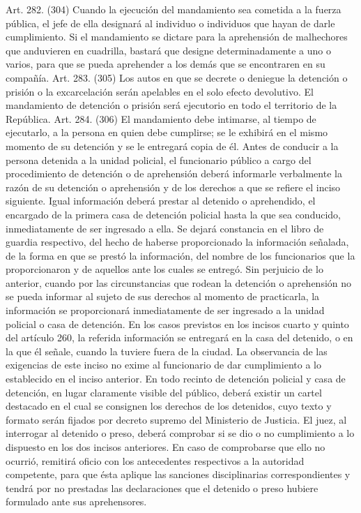     Art. 282. (304) Cuando la ejecución del mandamiento sea cometida a la fuerza pública, el jefe de ella designará al individuo o individuos que hayan de darle cumplimiento.
    Si el mandamiento se dictare para la aprehensión de malhechores que anduvieren en cuadrilla, bastará que designe determinadamente a uno o varios, para que se pueda aprehender a los demás que se encontraren en su compañía.
    Art. 283. (305) Los autos en que se decrete o deniegue la detención o prisión o la excarcelación serán apelables en el solo efecto devolutivo.
    El mandamiento de detención o prisión será ejecutorio en todo el territorio de la República.
    Art. 284. (306) El mandamiento debe intimarse, al tiempo de ejecutarlo, a la persona en quien debe cumplirse; se le exhibirá en el mismo momento de su detención y se le entregará copia de él.
    Antes de conducir a la persona detenida a la unidad policial, el funcionario público a cargo del procedimiento de detención o de aprehensión deberá informarle verbalmente la razón de su detención o aprehensión y de los derechos a que se refiere el inciso siguiente. Igual información deberá prestar al detenido o aprehendido, el encargado de la primera casa de detención policial hasta la que sea conducido, inmediatamente de ser ingresado a ella. Se dejará constancia en el libro de guardia respectivo, del hecho de haberse proporcionado la información señalada, de la forma en que se prestó la información, del nombre de los funcionarios que la proporcionaron y de aquellos ante los cuales se entregó. Sin perjuicio de lo anterior, cuando por las circunstancias que rodean la detención o aprehensión no se pueda informar al sujeto de sus derechos al momento de practicarla, la información se proporcionará inmediatamente de ser ingresado a la unidad policial o casa de detención. En los casos previstos en los incisos cuarto y quinto del artículo 260, la referida información se entregará en la casa del detenido, o en la que él señale, cuando la tuviere fuera de la ciudad. La observancia de las exigencias de este inciso no exime al funcionario de dar cumplimiento a lo establecido en el inciso anterior.
    En todo recinto de detención policial y casa de detención, en lugar claramente visible del público, deberá existir un cartel destacado en el cual se consignen los derechos de los detenidos, cuyo texto y formato serán fijados por decreto supremo del Ministerio de Justicia.
    El juez, al interrogar al detenido o preso, deberá comprobar si se dio o no cumplimiento a lo dispuesto en los dos incisos anteriores. En caso de comprobarse que ello no ocurrió, remitirá oficio con los antecedentes respectivos a la autoridad competente, para que ésta aplique las sanciones disciplinarias correspondientes y tendrá por no prestadas las declaraciones que el detenido o preso hubiere formulado ante sus aprehensores.

